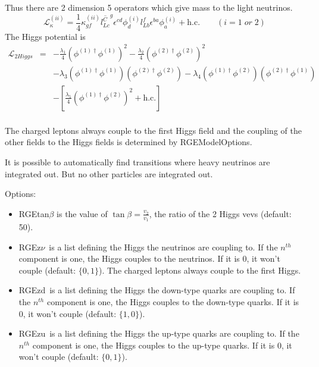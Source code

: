 \documentclass[10pt,a4paper,twoside]{scrartcl}
\begin{document}
Thus there are 2 dimension 5 operators which give mass to the light neutrinos.
\begin{equation*}
  \mathcal{L}_\kappa^{(ii)}=\frac{1}{4}\kappa_{gf}^{(ii)}\overline{l_{Lc}^C}^g\epsilon^{cd}\phi_d^{(i)}l_{Lb}^f\epsilon^{ba}\phi_a^{(i)}+\mathrm{h.c.}\quad\quad(i=1\;
  or\; 2)
\end{equation*}
The Higgs potential is
\begin{eqnarray*}
\mathcal{L}_{2Higgs}&=& -\frac{\lambda_1}{4}
\left(\phi^{(1)\dagger}\phi^{(1)}\right)^2 -\frac{\lambda_2}{4}
\left(\phi^{(2)\dagger}\phi^{(2)}\right)^2\\
&&-\lambda_3\left(\phi^{(1)\dagger}\phi^{(1)}\right)\left(\phi^{(2)\dagger}\phi^{(2)}\right)
-\lambda_4\left(\phi^{(1)\dagger}\phi^{(2)}\right)\left(\phi^{(2)\dagger}\phi^{(1)}\right)
\\ &&
-\left[\frac{\lambda_5}{4}\left(\phi^{(1)\dagger}\phi^{(2)}\right)^2+\mathrm{h.c.}\right]\\
\end{eqnarray*}

The charged leptons always couple to the first Higgs field and the coupling of
the other fields to the Higgs fields is determined by RGEModelOptions.

It is possible to automatically find transitions where heavy neutrinos are
integrated out.  But no other particles are integrated out.

Options:
\begin{itemize}
\item RGEtan$\beta$ is the value of $\tan\beta=\frac{v_2}{v_1}$, the ratio of the 2
  Higgs vevs (default: 50).
\item RGEz$\nu$\ is a list defining the Higgs the neutrinos are coupling to. If the $n^{th}$ component is one,
    the Higgs couples to the neutrinos. If it is 0, it won't
    couple (default: $\{0,1\}$). The charged leptons always couple to the
  first Higgs.
\item RGEzd\ is a list defining the Higgs the down-type quarks are coupling to. If the $n^{th}$ component is one,
    the Higgs couples to the down-type quarks. If it is 0, it won't
    couple (default: $\{1,0\}$).
\item RGEzu\ is a list defining the Higgs the up-type quarks are coupling to. If the $n^{th}$ component is one,
    the Higgs couples to the up-type quarks. If it is 0, it won't
    couple (default: $\{0,1\}$).

\end{itemize}
\end{document}
